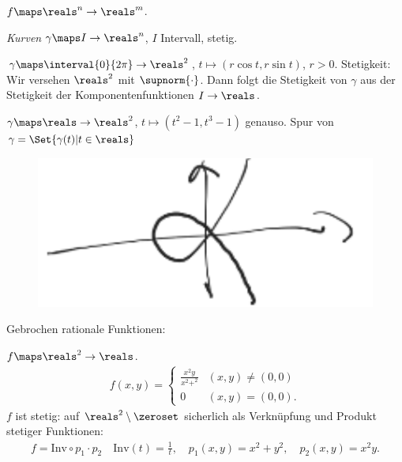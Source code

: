 \begin{beispiele}
    \( f\maps \reals^n\to \reals^m \).
    \begin{eigenschaftenenumerate}
        \item \emph{Kurven} \( \gamma\maps I\to \reals^n \), \( I \) Intervall, stetig.
        \begin{beispiele*}
            \item \( \gamma\maps \interval{0}{2\pi}\to \reals^2 \), \( t\mapsto (r \cos t, r \sin t) \), \( r>0 \).
            Stetigkeit: Wir versehen \( \reals^2 \) mit \( \supnorm{\cdot} \).
            Dann folgt die Stetigkeit von \( \gamma \) aus der Stetigkeit der Komponentenfunktionen \( I\to \reals \).
            \item \( \gamma\maps \reals\to \reals^2 \), \( t\mapsto (t^2-1,t^3-1) \) genauso.
            Spur von \( \gamma=\Set{\gamma(t)|t\in \reals} \)
            \begin{figure}[H]
                \centering
                \includegraphics[width=0.5\linewidth]{figures/komponentenstetigkeit_beispiel_hoch_2_gegen_hoch_3}
                \label{fig:komponentenstetigkeit_beispiel_hoch_2_gegen_hoch_3}
            \end{figure}
        \end{beispiele*}
        \item\label{stetigkeit:beispiel:gebrochen_rationale_funktionen} Gebrochen rationale Funktionen:
        \begin{beispiele*}
            \item \( f\maps \reals^2\to \reals \).
            \begin{align*}
                f(x,y)=\begin{cases}
                    \frac{x^2y}{x^2+^2}&(x,y)\neq (0,0)\\
                    0&(x,y)=(0,0).
                \end{cases}                
            \end{align*}
            \( f \) ist stetig: auf \( \reals^2\setminus \zeroset \) sicherlich als Verknüpfung und Produkt stetiger Funktionen:
            \begin{align*}
                f=\text{Inv}\circ p_1\cdot p_2\quad \text{Inv}(t)=\frac{1}{t},\quad p_1(x,y)=x^2+y^2,\quad p_2(x,y)=x^2y.

\end{align*}
\end{beispiele*}
\end{eigenschaftenenumerate}
\end{beispiele}
